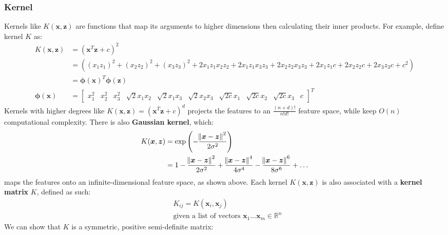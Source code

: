 \documentclass{article}
\renewcommand{\pmb}[1]{\boldsymbol{#1}}
\begin{document}
\subsubsection{Kernel}
	Kernels like $K(\pmb x, \pmb z)$ are functions that map its arguments to higher dimensions then calculating their inner products.
	For example, define kernel $K$ as:
	\begin{align*}
		K(\pmb x, \pmb z) &= (\pmb x^T \pmb z + c)^2 \\
		&= ((x_1 z_1)^2 + (x_2 z_2)^2 + (x_3 z_3)^2 + 2 x_1 z_1 x_2 z_2 + 2 x_1 z_1 x_3 z_3 + 2 x_2 z_2 x_3 z_3 + 2 x_1 z_1 c + 2 x_2 z_2 c + 2 x_3 z_3 c + c^2) \\
		&= \pmb\phi(\pmb x)^T \pmb\phi(\pmb z) \\
		\pmb\phi(\pmb x) &= \begin{bmatrix}
			x_1^2 & x_2^2 & x_3^2 & \sqrt 2 x_1 x_2 & \sqrt 2 x_1 x_3 & \sqrt 2 x_2 x_3 & \sqrt{2c} x_1 & \sqrt{2c} x_2 & \sqrt{2c} x_3 & c
		\end{bmatrix}^T
	\end{align*}
	Kernels with higher degrees like $K(\pmb x, \pmb z) = (\pmb x^T \pmb z + c)^d$ projects the features to an $\frac{(n+d)!}{n!d!}$ feature space, while keep $O(n)$ computational complexity. There is also \textbf{Gaussian kernel}, which: 
	\begin{align*}
		K(\pmb x, \pmb z) &= \exp \left( -\frac{\norm{\pmb x - \pmb z}^2}{2\sigma^2} \right)\\ 
		&= 1  - \frac{\norm{\pmb x - \pmb z}^2}{2\sigma^2} + \frac{\norm{\pmb x - \pmb z}^4}{4\sigma^4} - \frac{\norm{\pmb x - \pmb z}^6}{8\sigma^6} + \dots 
	\end{align*}
	maps the features onto an infinite-dimensional feature space, as shown above.\newline
	Each kernel $K(\pmb x, \pmb z)$ is also associated with a \textbf{kernel matrix} $K$, defined as such:
	\begin{align*}
		&K_{ij} = K(\pmb x_i, \pmb x_j) \\
		&\text{given a list of vectors $\pmb x_1 \dots \pmb x_m \in \mathbb{R}^n$}
	\end{align*}
	We can show that $K$ is a symmetric, positive semi-definite matrix:
\end{document}
